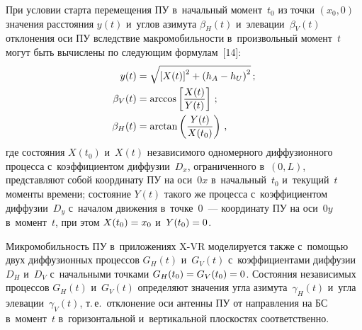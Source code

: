 \begin{multicols}{2}
  При условии старта перемещения ПУ в~начальный момент~$t_0$ из точки 
$(x_0,0)$ значения расстояния $y(t)$ и~углов азимута $\beta_H(t)$ 
и~элевации~$\beta_V(t)$ отклонения оси ПУ вследствие макромобильности 
в~произвольный момент~$t$ могут быть вычислены по следующим 
формулам~[14]:
  \begin{align*}
  y(t)  &= \sqrt{\left[ X(t)\right]^2+\left( h_A-h_U\right)^2}\,;
 \\
\beta_V (t) &=\mathrm{arccos}\left[ \displaystyle\frac{\displaystyle X(t)\mathstrut}{\displaystyle Y(t)\mathstrut}\right]\,;
\\
\beta_H  (t) &= \mathrm{arctan}\left( \displaystyle\frac{\displaystyle Y(t)\mathstrut}{\displaystyle X(t_0)\mathstrut}\right)\,,
\end{align*}
где состояния $X(t_0)$ и~$X(t)$ независимого одномерного диффузионного 
процесса с~коэффициентом диффузии~$D_x$, ограниченного в~$(0,L)$, 
представляют собой координату ПУ на оси~$0x$ в~начальный~$t_0$ 
и~текущий~$t$ моменты времени; состояние $Y(t)$ такого же процесса 
с~коэффициентом диффузии~$D_y$ с~началом движения в~точке~0~--- 
координату ПУ на оси~$0y$ в~момент~$t$, при этом $X(t_0)\hm= x_0$ 
и~$Y(t_0)\hm=0$.
  
  Микромобильность ПУ в~приложениях X-VR моделируется также  
с~по\-мощью двух диффузионных процессов $G_H(t)$ и~$G_V(t)$ 
с~коэффициентами диффузии~$D_H$ и~$D_V$ с~начальными точками 
$G_H(t_0)\hm= G_V(t_0)\hm=0$. Состояния независимых процессов $G_H(t)$ 
и~$G_V(t)$ определяют значения угла азимута~$\gamma_H(t)$ и~угла 
элевации~$\gamma_V(t)$, т.\,е.\ отклонение оси антенны ПУ от направления на 
БС в~момент~$t$ в~горизонтальной и~вертикальной плоскостях соответственно.


\end{multicols}
